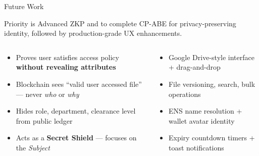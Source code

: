\documentclass[aspectratio=169]{beamer}
\begin{document}
\begin{frame}{Future Work}
\begin{tcolorbox}[bluebox, title=\textbf{Future Work --- Planned}]
\small
Priority is Advanced ZKP and to complete CP-ABE for privacy-preserving identity,
followed by production-grade UX enhancements.
\end{tcolorbox}
\vspace{0.15cm}
\begin{columns}[t]
\begin{tcolorbox}[navybox, title=\textbf{Advanced ZKP: Identity Privacy}]
\scriptsize
\begin{itemize}
  \item Proves user satisfies access policy \textbf{without revealing attributes}
  \item Blockchain sees ``valid user accessed file'' --- never \textit{who} or \textit{why}
  \item Hides role, department, clearance level from public ledger
  \item Acts as a \textbf{Secret Shield} --- focuses on the \textit{Subject}
\end{itemize}
\end{tcolorbox}
\begin{tcolorbox}[orangebox, title=\textbf{Production UX (Lower Priority)}]
\scriptsize
\begin{itemize}
  \item[\textcolor{warnorange!80!black}{$\circ$}] Google Drive-style interface + drag-and-drop
  \item[\textcolor{warnorange!80!black}{$\circ$}] File versioning, search, bulk operations
  \item[\textcolor{warnorange!80!black}{$\circ$}] ENS name resolution + wallet avatar identity
  \item[\textcolor{warnorange!80!black}{$\circ$}] Expiry countdown timers + toast notifications
\end{itemize}
\end{tcolorbox}
\end{columns}
\end{frame}
\end{document}
